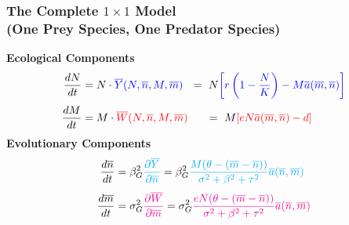 \documentclass[10pt]{beamer}
\begin{document}
\begin{frame}
	\frametitle{The Complete $1\times1$ Model \\ (One Prey Species, One Predator Species)}
	{\bf Ecological Components}
	\begin{align*}
		\frac{dN}{dt} &= N\cdot {\color{blue}\overline{Y}(N, \overline{n}, M, \overline{m})}\ \ =\ N{\color{blue}\left[r\left(1 - \frac{N}{K}\right) - M\overline{a}(\overline{m}, \overline{n})\right]}\\[.1cm]
		\frac{dM}{dt} &= M\cdot {\color{red}\overline{W}(N, \overline{n}, M, \overline{m})}\ \ \ \ \ =\ M{\color{red}\left[eN\overline{a}(\overline{m}, \overline{n}) - d\right]}
	\end{align*}
	{\bf Evolutionary Components}
	\begin{align*}
		\frac{d\overline{n}}{dt} &= \beta_G^2{\color{cyan}\frac{\partial \overline{Y}}{\partial \overline{n}}} = \beta_G^2{\color{cyan}\frac{M(\theta - (\overline{m} - \overline{n}))}{\sigma^2 + \beta^2 + \tau^2} \overline{a}(\overline{n}, \overline{m})}\\[.1cm]
		\frac{d\overline{m}}{dt} &= \sigma_G^2{\color{magenta}\frac{\partial \overline{W}}{\partial \overline{m}}} = \sigma_G^2{\color{magenta}\frac{eN(\theta - (\overline{m} - \overline{n}))}{\sigma^2 + \beta^2 + \tau^2} \overline{a}(\overline{n}, \overline{m})}
	\end{align*}
\end{frame}
\end{document}
